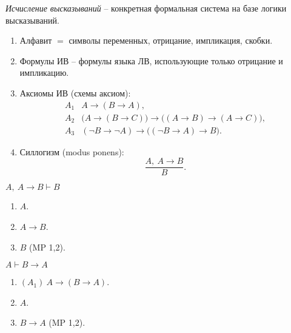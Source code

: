 \begin{definition}
    \emph{Исчисление высказываний} -- конкретная формальная система на базе логики высказываний.
    \begin{enumerate}
        \item Алфавит $ = $ символы переменных, отрицание, импликация, скобки.
        \item Формулы ИВ -- формулы языка ЛВ, использующие только отрицание и импликацию.
        \item Аксиомы ИВ (схемы аксиом):
              \[
                  \begin{array}{rl}
                      A_1 & A \rightarrow (B \rightarrow A),                                                                                 \\
                      A_2 & \big(A \rightarrow (B \rightarrow C)\big) \rightarrow \big((A \rightarrow B) \rightarrow (A \rightarrow C)\big), \\
                      A_3 & (\lnot B \rightarrow \lnot A) \rightarrow \big((\lnot B \rightarrow A) \rightarrow B \big).
                  \end{array}
              \]
        \item Силлогизм (modus ponens):
              \[
                  \frac{A, \ A \rightarrow B}{B}.
              \]
    \end{enumerate}
\end{definition}

\begin{example}
    $ A, \ A \rightarrow B \vdash B $
    \begin{enumerate}
        \item $ A $.
        \item $ A \rightarrow B $.
        \item $ B $ (MP 1,2).
    \end{enumerate}
\end{example}

\begin{example}
    $ A \vdash B \rightarrow A $
    \begin{enumerate}
        \item $ (A_1) \ A \rightarrow (B \rightarrow A) $.
        \item $ A $.
        \item $ B \rightarrow A $ (MP 1,2).
    \end{enumerate}
\end{example}

